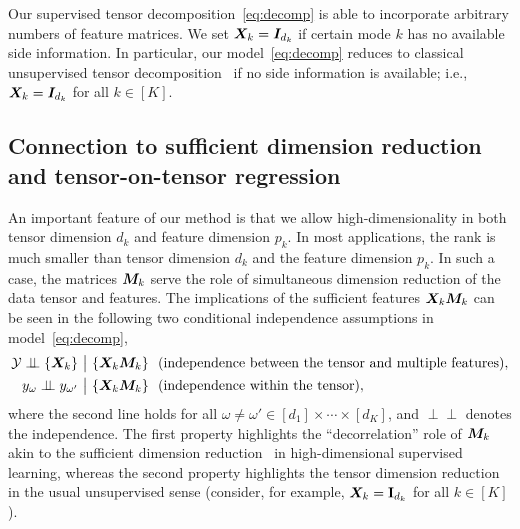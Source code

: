 \documentclass[12pt]{article}
\theoremstyle{plain}
\theoremstyle{definition}
\def\ci{\perp\!\!\!\perp}
\begin{document}
Our supervised tensor decomposition~\eqref{eq:decomp} is able to incorporate arbitrary numbers of feature matrices. We set $\bm X_k=\bm I_{d_k}$ if certain mode $k$ has no available side information. In particular, our model~\eqref{eq:decomp} reduces to classical unsupervised tensor decomposition~\citep{de2000multilinear,hong2018generalized} if no side information is available; i.e., $\bm X_k=\bm I_{d_k}$ for all $k\in[K]$.

\subsection{Connection to sufficient dimension reduction and tensor-on-tensor regression}
An important feature of our method is that we allow high-dimensionality in both tensor dimension $d_k$ and feature dimension $p_k$. In most applications, the rank is much smaller than tensor dimension $d_k$ and the feature dimension $p_k$. In such a case, the matrices $\bm M_k$ serve the role of simultaneous dimension reduction of the data tensor and features. The implications of the sufficient features $\bm X_k\bm M_k$ can be seen in the following two conditional independence assumptions in model~\eqref{eq:decomp},
\begin{align}
\tY \ci \{\mX_k\}&\ \big|\ \{\mX_k\mM_k\} \ \ \text{(independence between the tensor and multiple features)},\\
y_\omega \ci y_{\omega'} & \ \big|\ \{\mX_k\mM_k\}  \ \ \text{(independence within the tensor)},
\end{align}
where the second line holds for all $\omega\neq \omega' \in[d_1]\times\cdots\times[d_K]$, and $\ci$ denotes the independence. The first property highlights the ``decorrelation'' role of $\bm M_k$ akin to the sufficient dimension reduction~\citep{adragni2009sufficient} in high-dimensional supervised learning, whereas the second property highlights the tensor dimension reduction in the usual unsupervised sense (consider, for example, $\bm X_k=\mathbf{I}_{d_k}$ for all $k\in[K]$).
\end{document}
